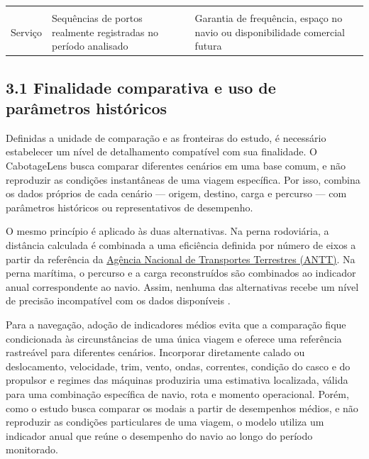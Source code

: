 \documentclass[brazil,]{article}
\let\oldsubsection\subsection
\renewcommand{\subsection}{\Needspace{12\baselineskip}\oldsubsection}
\begin{document}
\begin{longtable}[]{@{}lll@{}}
\begin{minipage}[t]{0.45\columnwidth}
\end{minipage}\tabularnewline
\begin{minipage}[t]{0.10\columnwidth}\raggedright
Serviço\strut
\end{minipage} & \begin{minipage}[t]{0.36\columnwidth}\raggedright
Sequências de portos realmente registradas no período analisado\strut
\end{minipage} & \begin{minipage}[t]{0.45\columnwidth}\raggedright
Garantia de frequência, espaço no navio ou disponibilidade comercial
futura\strut
\end{minipage}\tabularnewline
\bottomrule
\end{longtable}

\hypertarget{finalidade-comparativa-e-uso-de-paruxe2metros-histuxf3ricos}{%
\subsection{3.1 Finalidade comparativa e uso de parâmetros
históricos}\label{finalidade-comparativa-e-uso-de-paruxe2metros-histuxf3ricos}}

Definidas a unidade de comparação e as fronteiras do estudo, é
necessário estabelecer um nível de detalhamento compatível com sua
finalidade. O CabotageLens busca comparar diferentes cenários em uma
base comum, e não reproduzir as condições instantâneas de uma viagem
específica. Por isso, combina os dados próprios de cada cenário ---
origem, destino, carga e percurso --- com parâmetros históricos ou
representativos de desempenho.

O mesmo princípio é aplicado às duas alternativas. Na perna rodoviária,
a distância calculada é combinada a uma eficiência definida por número
de eixos a partir da referência da
\href{http://www.antt.gov.br/}{Agência Nacional de Transportes
Terrestres (ANTT)}. Na perna marítima, o percurso e a carga reconstruídos
são combinados ao indicador anual correspondente ao navio. Assim,
nenhuma das alternativas recebe um nível de precisão incompatível com
os dados disponíveis \parencite{antt2025,antaq2025,emsa2026}.

Para a navegação, adoção de indicadores médios evita que a comparação
fique condicionada às circunstâncias de uma única viagem e oferece uma
referência rastreável para diferentes cenários. Incorporar diretamente
calado ou deslocamento, velocidade, trim, vento, ondas, correntes,
condição do casco e do propulsor e regimes das máquinas produziria uma
estimativa localizada, válida para uma combinação específica de navio,
rota e momento operacional. Porém, como o estudo busca comparar os
modais a partir de desempenhos médios, e não reproduzir as condições
particulares de uma viagem, o modelo utiliza um indicador anual que
reúne o desempenho do navio ao longo do período monitorado.
\end{document}
